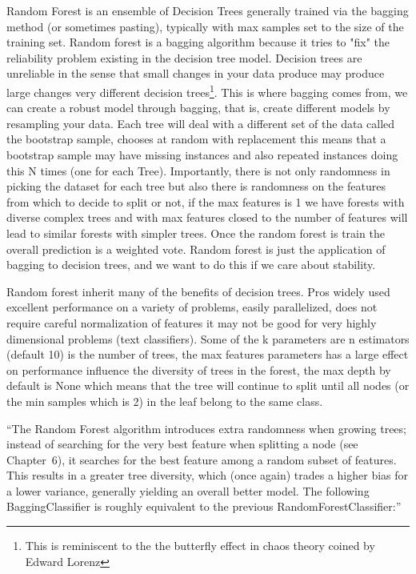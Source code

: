 \documentclass[11pt]{article}
\theoremstyle{definition}
\theoremstyle{remark}
\begin{document}
{Random Forest is an ensemble of Decision Trees generally trained via the bagging method (or sometimes pasting), typically with max samples set to the size of the training set.
Random forest is a bagging algorithm because it tries to "fix" the reliability problem existing in the decision tree model. Decision trees are unreliable in the sense that small changes in your data produce may produce large changes very different decision trees\footnote{This is reminiscent to the the butterfly effect in chaos theory coined by Edward Lorenz}. This is where bagging comes from, we can create a robust model through bagging, that is, create different models by resampling your data. Each tree will deal with a different set of the data called the bootstrap sample, chooses at random with replacement this means that a bootstrap sample may have missing instances and also repeated instances doing this N times (one for each Tree). Importantly, there is not only randomness in picking the dataset for each tree but also there is randomness on the features from which to decide to split or not, if the max features is 1 we have forests with diverse complex trees and with max features closed to the number of features will lead to similar forests with simpler trees. Once the random forest is train the overall prediction is a weighted vote.
Random forest is just the application of bagging to decision trees, and we want to do this if we care about stability.

Random forest inherit many of the benefits of decision trees. Pros widely used excellent performance on a variety of problems, easily parallelized, does not require careful normalization of features it may not be good for very highly dimensional problems (text classifiers). Some of the k parameters are n estimators (default 10) is the number of trees, the max features parameters has a large effect on performance influence the diversity of trees in the forest, the max depth by default is None which means that the tree will continue to split until all nodes (or the min samples which is 2) in the leaf belong to the same class.

“The Random Forest algorithm introduces extra randomness when growing trees; instead of searching for the very best feature when splitting a node (see Chapter 6), it searches for the best feature among a random subset of features. This results in a greater tree diversity, which (once again) trades a higher bias for a lower variance, generally yielding an overall better model. The following BaggingClassifier is roughly equivalent to the previous RandomForestClassifier:”


}
\end{document}
